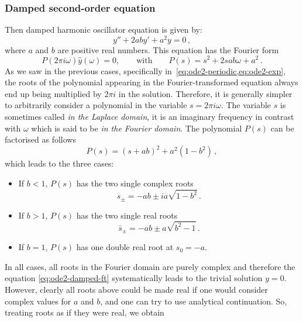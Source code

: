 \subsubsection{Damped second-order equation}
Then damped harmonic oscillator equation is given by:
\begin{equation}
  y''+2aby'+a^2y=0\,,
\end{equation}
where $a$ and $b$ are positive real numbers. This equation has the Fourier form
\begin{equation}
  \label{eq:ode2-damped-ft}
  P(2\pi i\omega)\hat{y}(\omega)=0,\qquad\text{with}\qquad
  P(s)=s^2+2sab\omega+a^2\,.
\end{equation}
As we saw in the previous cases, specifically in~\cref{eq:ode2-periodic,eq:ode2-exp}, the
roots of the polynomial appearing in the Fourier-transformed equation always end up being
multiplied by $2\pi i$ in the solution. Therefore, it is generally simpler to arbitrarily
consider a polynomial in the variable $s=2\pi i\omega$. The variable $s$ is sometimes
called \emph{in the Laplace domain}, it is an imaginary frequency in contrast with
$\omega$ which is said to be \emph{in the Fourier domain}. The polynomial $P(s)$ can be
factorised as follows
\begin{equation}
  P(s)=(s+ab)^2+a^2(1-b^2)\,,
\end{equation}
which leads to the three cases:
\begin{itemize}
  \item If $b<1$, $P(s)$ has the two single complex roots
    \begin{equation}
      s_{\pm}=-ab\pm ia\sqrt{1-b^2}\,.
    \end{equation}
  \item If $b>1$, $P(s)$ has the two single real roots
    \begin{equation}
      \bar{s}_{\pm}=-ab\pm a\sqrt{b^2-1}\,.
    \end{equation}
  \item If $b=1$, $P(s)$ has one double real root at $s_0=-a$.
\end{itemize}
In all cases, all roots in the Fourier domain are purely complex and therefore the
equation \cref{eq:ode2-damped-ft} systematically leads to the trivial solution $y=0$.
However, clearly all roots above could be made real if one would consider complex values
for $a$ and $b$, and one can try to use analytical continuation. So, treating roots as if
they were real, we obtain
